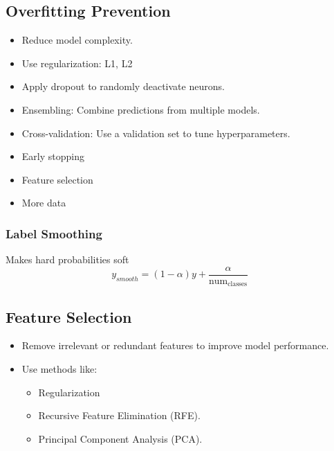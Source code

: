 \documentclass[12pt,a4paper]{article}
\begin{document}
\subsection{Overfitting Prevention}
\begin{itemize}
    \item Reduce model complexity.
    \item Use regularization: L1, L2 
    \item Apply dropout to randomly deactivate neurons.
    \item Ensembling: Combine predictions from multiple models.
    \item Cross-validation: Use a validation set to tune hyperparameters.
    \item Early stopping
    \item Feature selection
    \item More data
\end{itemize}
\subsubsection{Label Smoothing}
Makes hard probabilities soft
\[y_{smooth} = (1-\alpha)y + \frac{\alpha}{\text{num}_{\text{classes}}}\]

\subsection{Feature Selection}
\begin{itemize}
    \item Remove irrelevant or redundant features to improve model performance.
    \item Use methods like:
    \begin{itemize}
        \item Regularization 
        \item Recursive Feature Elimination (RFE).
        \item Principal Component Analysis (PCA).
    \end{itemize}
\end{itemize}
\end{document}
